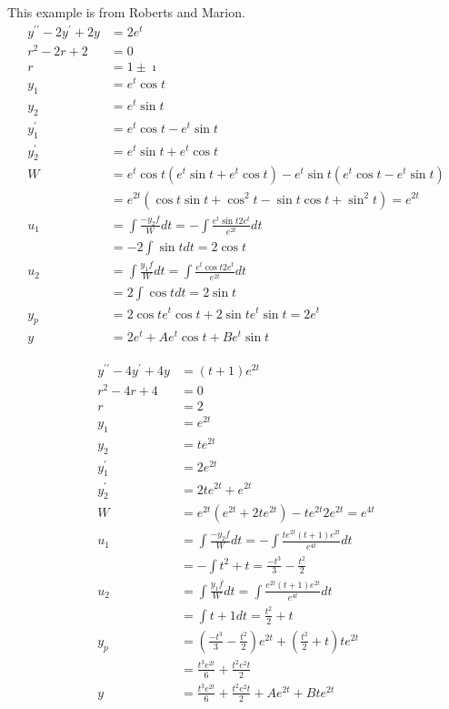 \documentclass[fleqn,letterpaper]{report}
\begin{document}
\begin{example}
This example is from Roberts and Marion.
\begin{align*}
y^{\prime\prime} - 2y^{\prime} + 2y & = 2e^t \\
r^2 -2r +2 & = 0 \\
r & = 1 \pm \imath \\
y_1 & = e^t \cos t \\
y_2 & = e^t \sin t \\
y_1^\prime & = e^t \cos t - e^t \sin t \\
y_2^\prime & = e^t \sin t + e^t \cos t \\
W & = e^t \cos t (e^t \sin t + e^t \cos t) - e^t \sin t (e^t \cos
t - e^t \sin t) \\
& = e^{2t} (\cos t \sin t + \cos^2 t - \sin t \cos t + \sin^2 t)
= e^{2t} \\
u_1 & = \int \frac{-y_2 f}{W} dt = -\int \frac{ e^t \sin t
2e^t}{e^{2t}}dt \\
& = -2 \int \sin t dt = 2 \cos t \\
u_2 & = \int \frac{y_1 f}{W} dt = \int \frac{ e^t \cos t
2e^t}{e^{2t}}dt \\
& = 2 \int \cos t dt = 2 \sin t \\
y_p & = 2\cos t e^t \cos t + 2 \sin t e^t \sin t = 2e^t \\
y & = 2e^t + Ae^t \cos t + B e^t \sin t
\end{align*}
\end{example}

\begin{example}
\begin{align*}
y^{\prime\prime} - 4y^{\prime} + 4y & = (t+1)e^{2t} \\
r^2 -4r +4 & = 0 \\
r & = 2 \\
y_1 & = e^{2t} \\
y_2 & = te^{2t} \\
y_1^\prime & = 2e^{2t} \\
y_2^\prime & = 2te^{2t} + e^{2t} \\
W & = e^{2t} (e^{2t} + 2te^{2t}) - te^{2t} 2e^{2t} = e^{4t} \\
u_1 & = \int \frac{-y_2 f}{W} dt = -\int
\frac{te^{2t}(t+1)e^{2t}}{e^{4t}} dt \\
& = - \int t^2 + t = \frac{-t^3}{3} - \frac{t^2}{2} \\
u_2 & = \int \frac{y_1 f}{W} dt = \int \frac{ e^{2t}
(t+1)e^{2t}}{e^{4t}} dt \\
& = \int t+1 dt = \frac{t^2}{2} + t \\
y_p & = \left( \frac{-t^3}{3} - \frac{t^2}{2} \right) e^{2t} +
\left( \frac{t^2}{2} + t \right) te^{2t} \\
& = \frac{t^3 e^{2t}}{6} + \frac{t^2e^2t}{2} \\
y & = \frac{t^3 e^{2t}}{6} + \frac{t^2e^2t}{2} + Ae^{2t} +
Bte^{2t}
\end{align*}
\end{example}
\end{document}
